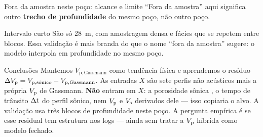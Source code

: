 \documentclass[aspectratio=169,10pt]{beamer}
\begin{document}
\begin{frame}{Fora da amostra neste poço: alcance e limite}
  \footnotesize
  ``Fora da amostra'' aqui significa outro \textbf{trecho de profundidade} do
  mesmo poço, não outro poço.
  \vspace{0.10cm}
  \centering
  \vspace{0.10cm}
  \begin{exampleblock}{Intervalo curto}
    \scriptsize
    São só 28~m, com amostragem densa e fácies que se repetem entre blocos.
    Essa validação é mais branda do que o nome ``fora da amostra'' sugere:
    o modelo interpola em profundidade no mesmo poço.
  \end{exampleblock}
\end{frame}

\begin{frame}{Conclusões}
  \footnotesize
  Mantemos $V_{\mathrm{p,Gassmann}}$ como tendência física e aprendemos o
  resíduo
  $\dVp = \Vpsonsub - V_{\mathrm{p,Gassmann}}$.
  \vspace{0.08cm}
  As entradas $X$ são sete perfis não acústicos mais a própria $\Vp$ de
  Gassmann. \textbf{Não} entram em $X$: a porosidade sônica \phiS{}, o tempo
  de trânsito $\Dt$ do perfil sônico, nem $\Vp$ e $\Vs$ derivados dele ---
  isso copiaria o alvo.
  \vspace{0.08cm}
  A validação usa três blocos de profundidade neste poço. A pergunta empírica
  é se esse residual tem estrutura nos logs --- ainda sem tratar a $\Vp$
  híbrida como modelo fechado.
\end{frame}
\end{document}
